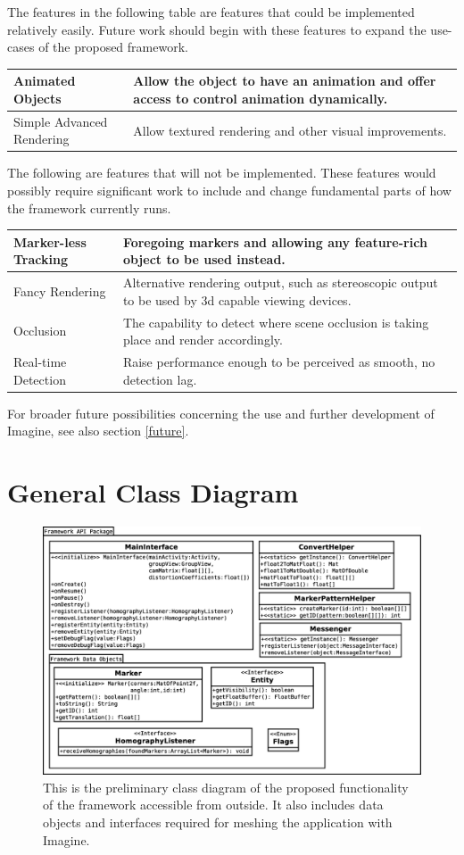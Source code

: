 The features in the following table are features that could be implemented relatively easily.
Future work should begin with these features to expand the use-cases of the proposed framework.

\begin{tabulary}{\textwidth}{L || L}
Animated Objects & Allow the object to have an animation and offer access to control animation dynamically.\\
\hline
Simple Advanced Rendering & Allow textured rendering and other visual improvements.\\
\end{tabulary}

The following are features that will not be implemented.
These features would possibly require significant work to include and change fundamental parts of how the framework currently runs.

\begin{tabulary}{\textwidth}{L || L}
Marker-less Tracking & Foregoing markers and allowing any feature-rich object to be used instead.\\
\hline
Fancy Rendering & Alternative rendering output, such as stereoscopic output to be used by 3d capable viewing devices.\\
\hline
Occlusion & The capability to detect where scene occlusion is taking place and render accordingly.\\
\hline
Real-time Detection & Raise performance enough to be perceived as smooth, no detection lag.\\
\end{tabulary}

For broader future possibilities concerning the use and further development of Imagine, see also section \ref{future}.

\section{General Class Diagram}

\begin{figure}
	\centering
	\includegraphics[width=13cm]{img/class_diagram.eps}
	\caption[Public Class Diagram]{This is the preliminary class diagram of the proposed functionality of the framework accessible from outside. It also includes data objects and interfaces required for meshing the application with Imagine.}
	\label{fig:class_diagram}
\end{figure}

